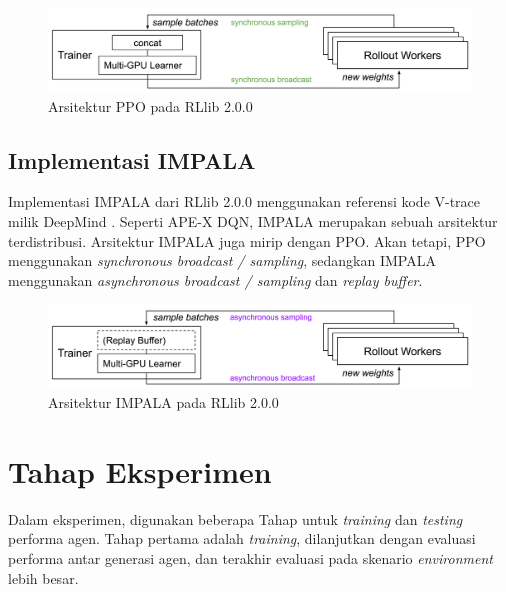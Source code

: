 \begin{figure}[H]
  \centering
    \includegraphics[scale=0.6]{gambar/rllib_ppo_architecture.png}
    \caption{Arsitektur PPO pada RLlib 2.0.0 \citep{rllibDocumentation}}
    \label{fig:rllib_ppo_architecture}
\end{figure}

\subsection{Implementasi IMPALA}
Implementasi IMPALA dari RLlib 2.0.0 menggunakan referensi kode V-trace milik DeepMind \citep{impala}.
Seperti APE-X DQN, IMPALA merupakan sebuah arsitektur terdistribusi. Arsitektur IMPALA juga mirip dengan PPO.
Akan tetapi, PPO menggunakan \emph{synchronous broadcast / sampling}, sedangkan IMPALA menggunakan \emph{asynchronous broadcast / sampling} dan \emph{replay buffer}.

\begin{figure}[H]
  \centering
    \includegraphics[scale=0.6]{gambar/rllib_impala_architecture.png}
    \caption{Arsitektur IMPALA pada RLlib 2.0.0 \citep{rllibDocumentation}}
    \label{fig:rllib_impala_architecture}
\end{figure}

\section{Tahap Eksperimen}
Dalam eksperimen, digunakan beberapa Tahap untuk \emph{training} dan \emph{testing} performa agen.
Tahap pertama adalah \emph{training}, dilanjutkan dengan evaluasi performa antar generasi agen, dan terakhir
evaluasi pada skenario \emph{environment} lebih besar.

